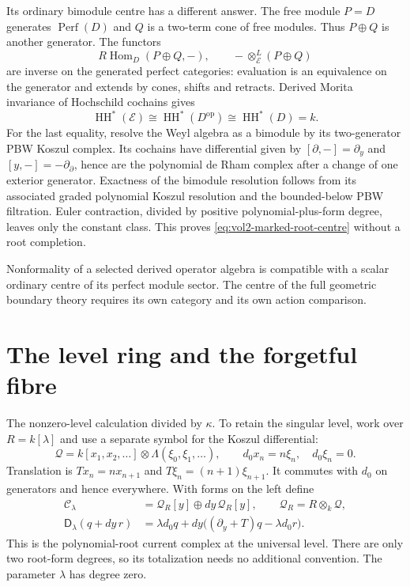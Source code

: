 Its ordinary bimodule centre has a different answer. The free
module $P=D$ generates $\operatorname{Perf}(D)$ and $Q$ is a
two-term cone of free modules. Thus $P\oplus Q$ is another
generator. The functors
\[
 R\operatorname{Hom}_D(P\oplus Q,-),\qquad
 -\otimes_{\mathscr E}^L(P\oplus Q)
\]
are inverse on the generated perfect categories: evaluation
is an equivalence on the generator and extends by cones,
shifts and retracts. Derived Morita invariance of Hochschild
cochains \cite[\S5.4]{KellerDG2006} gives
\begin{equation}\label{eq:vol2-marked-root-centre}
 \operatorname{HH}^*(\mathscr E)
   \cong\operatorname{HH}^*(D^{\mathrm{op}})
   \cong\operatorname{HH}^*(D)=k.
\end{equation}
For the last equality, resolve the Weyl algebra as a bimodule
by its two-generator PBW Koszul complex. Its cochains have
differential given by $[\partial,-]=\partial_y$ and
$[y,-]=-\partial_\partial$, hence are the polynomial de Rham
complex after a change of one exterior generator. Exactness of
the bimodule resolution follows from its associated graded
polynomial Koszul resolution and the bounded-below PBW filtration.
Euler contraction, divided by positive polynomial-plus-form
degree, leaves only the constant class. This proves
\eqref{eq:vol2-marked-root-centre} without a root completion.

Nonformality of a selected derived operator algebra is compatible
with a scalar ordinary centre of its perfect module sector.
The centre of the full geometric boundary theory requires its
own category and its own action comparison.

\section{The level ring and the forgetful fibre}
\label{sec:vol2-integral-current-fibre}

The nonzero-level calculation divided by $\kappa$. To retain the
singular level, work over $R=k[\lambda]$ and use a separate symbol
for the Koszul differential:
\[
 \mathcal Q=k[x_1,x_2,\ldots]\otimes\Lambda(\xi_0,\xi_1,\ldots),
 \qquad d_0x_n=n\xi_n,\quad d_0\xi_n=0.
\]
Translation is $Tx_n=nx_{n+1}$ and
$T\xi_n=(n+1)\xi_{n+1}$. It commutes with $d_0$ on generators
and hence everywhere. With forms on the left define
\begin{equation}\label{eq:vol2-integral-current-complex}
 \begin{split}
 \mathcal C_\lambda&=\mathcal Q_R[y]\oplus dy\,\mathcal Q_R[y],\qquad
        \mathcal Q_R=R\otimes_k\mathcal Q,\\
 \mathsf D_\lambda(q+dy\,r)
   &=\lambda d_0q+dy\bigl((\partial_y+T)q-\lambda d_0r\bigr).
 \end{split}
\end{equation}
This is the polynomial-root current complex at the universal level.
There are only two root-form degrees, so its totalization needs
no additional convention. The parameter $\lambda$ has degree zero.

